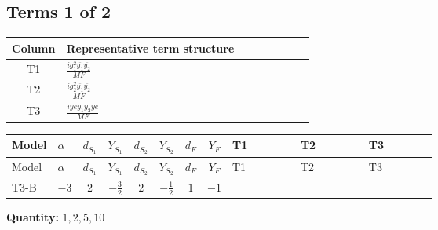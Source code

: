 \documentclass[8pt]{article}
\begin{document}
\begin{landscape}
\subsection*{Terms 1 of 2}
\begin{center}
\begin{tabular}{@{}c >{\raggedright\arraybackslash}p{0.82\linewidth}@{}}
\toprule
Column & Representative term structure \\
\midrule
T1 & \(\displaystyle \frac{i g_{1}^{2} \overline{y_{1}} \overline{y_{2}}}{MF}\) \\
\midrule
T2 & \(\displaystyle \frac{i g_{2}^{2} \overline{y_{1}} \overline{y_{2}}}{MF}\) \\
\midrule
T3 & \(\displaystyle \frac{i ye \overline{y_{1}} \overline{y_{2}} \overline{ye}}{MF}\) \\
\midrule
\bottomrule
\end{tabular}
\end{center}
\smallskip
\tiny
\begin{longtable}{@{}llcccccc >{\raggedright\arraybackslash}p{0.21\linewidth} >{\raggedright\arraybackslash}p{0.21\linewidth} >{\raggedright\arraybackslash}p{0.21\linewidth}@{}}
\toprule
Model & $\alpha$ & $d_{S_1}$ & $Y_{S_1}$ & $d_{S_2}$ & $Y_{S_2}$ & $d_F$ & $Y_F$ & T1 & T2 & T3 \\
\midrule
\endfirsthead
\toprule
Model & $\alpha$ & $d_{S_1}$ & $Y_{S_1}$ & $d_{S_2}$ & $Y_{S_2}$ & $d_F$ & $Y_F$ & T1 & T2 & T3 \\
\midrule
\endhead
T3-B & $-3$ & $2$ & $-\frac{3}{2}$ & $2$ & $-\frac{1}{2}$ & $1$ & $-1$ & \scriptsize\adjustbox{max width=\linewidth}{$\begin{gathered} \frac{3 i g_{1}^{2} \overline{y_{1}} \overline{y_{2}}}{4 MF}\end{gathered}$} & \scriptsize\adjustbox{max width=\linewidth}{$\begin{gathered} \frac{3 i g_{2}^{2} \overline{y_{1}} \overline{y_{2}}}{8 MF}\end{gathered}$} & \scriptsize\adjustbox{max width=\linewidth}{$\begin{gathered} - \frac{i ye \overline{y_{1}} \overline{y_{2}} \overline{ye}}{8 MF}\end{gathered}$} \\
\midrule
\bottomrule
\end{longtable}
\clearpage
\noindent\textbf{Quantity: }$\mathrm{1,2,5,10}$\par\smallskip

\end{landscape}
\end{document}
